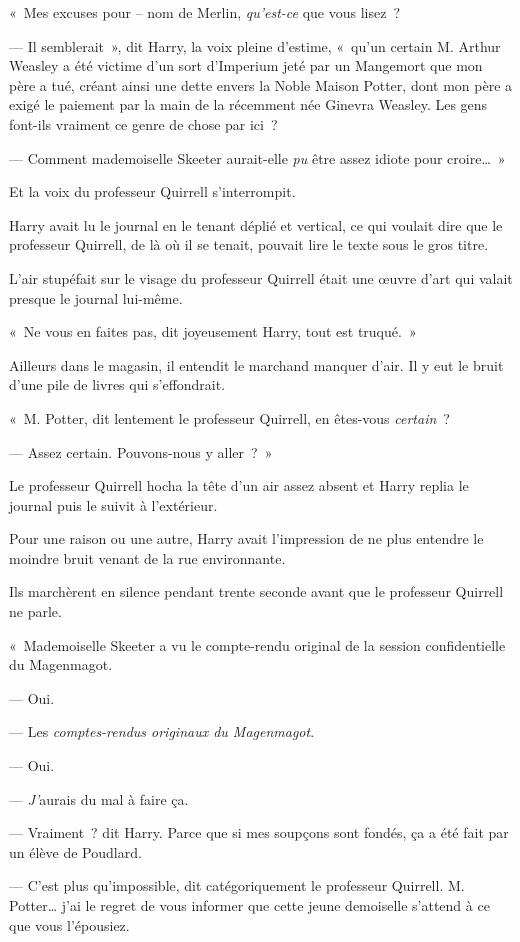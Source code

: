 «~Mes excuses pour -- nom de Merlin, \emph{qu'est-ce} que vous lisez~?

--- Il semblerait~», dit Harry, la voix pleine d'estime, «~qu'un certain M. Arthur Weasley a été victime d'un sort d'Imperium jeté par un Mangemort que mon père a tué, créant ainsi une dette envers la Noble Maison Potter, dont mon père a exigé le paiement par la main de la récemment née Ginevra Weasley.
Les gens font-ils vraiment ce genre de chose par ici~?

--- Comment mademoiselle Skeeter aurait-elle \emph{pu} être assez idiote pour croire…~»

Et la voix du professeur Quirrell s'interrompit.

Harry avait lu le journal en le tenant déplié et vertical, ce qui voulait dire que le professeur Quirrell, de là où il se tenait, pouvait lire le texte sous le gros titre.

L'air stupéfait sur le visage du professeur Quirrell était une œuvre d'art qui valait presque le journal lui-même.

«~Ne vous en faites pas, dit joyeusement Harry, tout est truqué.~»

Ailleurs dans le magasin, il entendit le marchand manquer d'air.
Il y eut le bruit d'une pile de livres qui s'effondrait.

«~M. Potter, dit lentement le professeur Quirrell, en êtes-vous \emph{certain}~?

--- Assez certain.
Pouvons-nous y aller~?~»

Le professeur Quirrell hocha la tête d'un air assez absent et Harry replia le journal puis le suivit à l'extérieur.

Pour une raison ou une autre, Harry avait l'impression de ne plus entendre le moindre bruit venant de la rue environnante.

Ils marchèrent en silence pendant trente seconde avant que le professeur Quirrell ne parle.

«~Mademoiselle Skeeter a vu le compte-rendu original de la session confidentielle du Magenmagot.

--- Oui.

--- Les \emph{comptes-rendus originaux du Magenmagot}.

--- Oui.

--- \emph{J'}aurais du mal à faire ça.

--- Vraiment~? dit Harry.
Parce que si mes soupçons sont fondés, ça a été fait par un élève de Poudlard.

--- C'est plus qu'impossible, dit catégoriquement le professeur Quirrell.
M. Potter… j'ai le regret de vous informer que cette jeune demoiselle s'attend à ce que vous l'épousiez.

